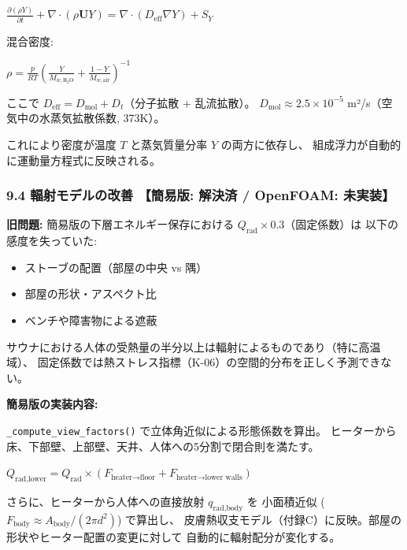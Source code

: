 \documentclass[a4paper,11pt]{article}
\begin{document}
$
\frac{\partial (\rho Y)}{\partial t} + \nabla \cdot (\rho \mathbf{U} Y)
= \nabla \cdot (D_{\text{eff}} \nabla Y) + S_Y
$

混合密度:

$
\rho = \frac{p}{R T} \left( \frac{Y}{M_{w,\text{H}_2\text{O}}} + \frac{1-Y}{M_{w,\text{air}}} \right)^{-1}
$

ここで $D_{\text{eff}} = D_{\text{mol}} + D_t$（分子拡散 + 乱流拡散）。
$D_{\text{mol}} \approx 2.5 \times 10^{-5}$ m²/s（空気中の水蒸気拡散係数, 373K）。

これにより密度が温度 $T$ と蒸気質量分率 $Y$ の両方に依存し、
組成浮力が自動的に運動量方程式に反映される。

\subsubsection{9.4 輻射モデルの改善 \textnormal{【簡易版: 解決済 / OpenFOAM: 未実装】}}

\textbf{旧問題:} 簡易版の下層エネルギー保存における $Q_{\text{rad}} \times 0.3$（固定係数）は
以下の感度を失っていた:

\begin{itemize} \item ストーブの配置（部屋の中央 vs 隅） \end{itemize}
\begin{itemize} \item 部屋の形状・アスペクト比 \end{itemize}
\begin{itemize} \item ベンチや障害物による遮蔽 \end{itemize}

サウナにおける人体の受熱量の半分以上は輻射によるものであり（特に高温域）、
固定係数では熱ストレス指標（K-06）の空間的分布を正しく予測できない。

\textbf{簡易版の実装内容:}

\texttt{\_compute\_view\_factors()} で立体角近似による形態係数を算出。
ヒーターから床、下部壁、上部壁、天井、人体への5分割で閉合則を満たす。

$
Q_{\text{rad,lower}} = Q_{\text{rad}} \times (F_{\text{heater} \to \text{floor}} + F_{\text{heater} \to \text{lower walls}})
$

さらに、ヒーターから人体への直接放射 $q_{\text{rad,body}}$ を
小面積近似 ($F_{\text{body}} \approx A_{\text{body}} / (2\pi d^2)$) で算出し、
皮膚熱収支モデル（付録C）に反映。部屋の形状やヒーター配置の変更に対して
自動的に輻射配分が変化する。
\end{document}
